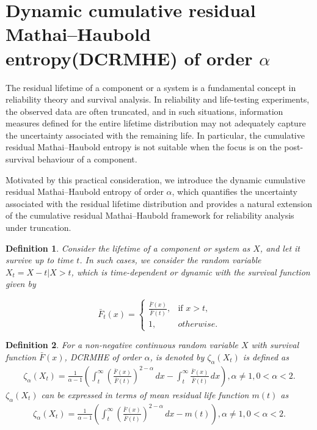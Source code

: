 \documentclass[11pt,reqno]{amsart}
\theoremstyle{tight}
\newtheorem{definition}{Definition}[section]
\begin{document}
\section{Dynamic cumulative residual Mathai--Haubold entropy(DCRMHE) of order $\alpha$}
The residual lifetime of a component or a system is a fundamental concept in reliability theory and survival analysis.
In reliability and life-testing experiments, the observed data are often truncated, and in such situations,
information measures defined for the entire lifetime distribution may not adequately capture the uncertainty associated
with the remaining life. In particular, the cumulative residual Mathai--Haubold entropy is not suitable
when the focus is on the post-survival behaviour of a component.

Motivated by this practical consideration, we introduce the dynamic cumulative residual Mathai--Haubold
entropy of order $\alpha$, which quantifies the uncertainty associated with the residual lifetime distribution
and provides a natural extension of the cumulative residual Mathai--Haubold  framework for reliability analysis under truncation.

\begin{definition}
Consider the lifetime of a component or system as $X$, and let it survive up to time $t$. In such cases, we consider the random variable $X_t=X-t|X>t$, which is time-dependent or dynamic with the survival function given by

\[
\bar{F}_t(x)=
\begin{cases}
    \frac{\bar{F}(x)}{\bar{F}(t)}, & \text{if $x>t$},\\
    1, & \text{$otherwise$}.
\end{cases}
\]
\end{definition}


\begin{definition}
 For a non-negative continuous random variable $X$ with survival function $\bar{F}(x)$, DCRMHE of order $\alpha$, is denoted by $\zeta_\alpha(X_t)$ is defined as
\begin{align}\label{ACRM t}
    \zeta_\alpha(X_t)= \frac{1}{\alpha-1}\left( {\int_t^\infty} \left(\frac{\bar{F}(x)}{\bar{F}(t)}\right)^{2-\alpha} \,dx -{\int_t^\infty} \frac{\bar{F}(x)}{\bar{F}(t)} \,dx\right), \alpha \neq 1, 0<\alpha<2.
\end{align}
$\zeta_\alpha(X_t)$ can be expressed in terms of mean residual life function $m(t)$ as
\begin{align}
\zeta_\alpha(X_t)= \frac{1}{\alpha-1}\left( {\int_t^\infty} \left(\frac{\bar{F}(x)}{\bar{F}(t)}\right)^{2-\alpha} \,dx -m(t)\right), \alpha \neq 1, 0<\alpha<2.
\end{align}
\end{definition}
\end{document}
